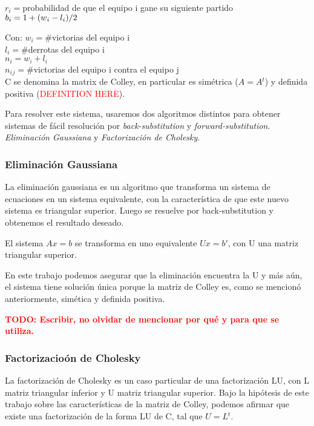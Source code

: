 $r{_i} = $probabilidad de que el equipo i gane su siguiente partido \\

$b{_i} = 1 + (w{_i} - l{_i}) / 2 \\ $

Con:
$w{_i} = $\#victorias del equipo i \\

$l{_i} = $\#derrotas del equipo i \\

$n{_i} = w{_i} + l{_i}$ \\

$n{_i}{_j} = $\#victorias del equipo i contra el equipo j \\

C se denomina la matrix de Colley, en particular es sim\'etrica ($A = A{^t}$) y definida positiva (\textcolor{red}{DEFINITION HERE}).

Para resolver este sistema, usaremos dos algoritmos distintos para obtener sistemas de f\'acil resoluci\'on por \textit{back-substitution} y \textit{forward-substitution}. \textit{Eliminaci\'on Gaussiana} y \textit{Factorizaci\'on de Cholesky}.

\subsubsection{Eliminaci\'on Gaussiana}

La eliminaci\'on gaussiana es un algoritmo que transforma un sistema de ecuaciones en un sistema equivalente, con la caracter\'istica de que este nuevo sistema es triangular superior. Luego se resuelve por back-substitution y obtenemos el resultado deseado.

El sistema $Ax = b$ se transforma en uno equivalente $Ux = b'$, con U una matriz triangular superior.

En este trabajo podemos asegurar que la eliminaci\'on encuentra la U y m\'as a\'un, el sistema tiene soluci\'on \'unica porque la matriz de Colley es, como se mencion\'o anteriormente, sim\'etica y definida positiva.

\textcolor{red}{\textbf{TODO: Escribir, no olvidar de mencionar por qu\'e y para que se utiliza.}}

\subsubsection{Factorizacio\'on de Cholesky}

La factorizaci\'on de Cholesky es un caso particular de una factorizaci\'on LU, con L matriz triangular inferior y U matriz triangular superior. Bajo la hip\'otesis de este trabajo sobre las caracter\'isticas de la matriz de Colley, podemos afirmar que existe una factorizaci\'on de la forma LU de C, tal que $U = L{^t}$. \\


